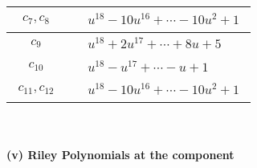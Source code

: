 \documentclass[1p]{elsarticle_modified}
\theoremstyle{definition}
\begin{document}
\begin{tabular}{m{50pt}|m{274pt}}
\hline $$\begin{aligned}c_{7},c_{8}\end{aligned}$$&$\begin{aligned}
&u^{18}-10 u^{16}+\cdots-10 u^2+1
\end{aligned}$\\
\hline $$\begin{aligned}c_{9}\end{aligned}$$&$\begin{aligned}
&u^{18}+2 u^{17}+\cdots+8 u+5
\end{aligned}$\\
\hline $$\begin{aligned}c_{10}\end{aligned}$$&$\begin{aligned}
&u^{18}- u^{17}+\cdots- u+1
\end{aligned}$\\
\hline $$\begin{aligned}c_{11},c_{12}\end{aligned}$$&$\begin{aligned}
&u^{18}-10 u^{16}+\cdots-10 u^2+1
\end{aligned}$\\
\hline
\end{tabular}\\~\\
\newpage\renewcommand{\arraystretch}{1}
\flushleft \textbf{(v) Riley Polynomials at the component}\newline \\
\end{document}

